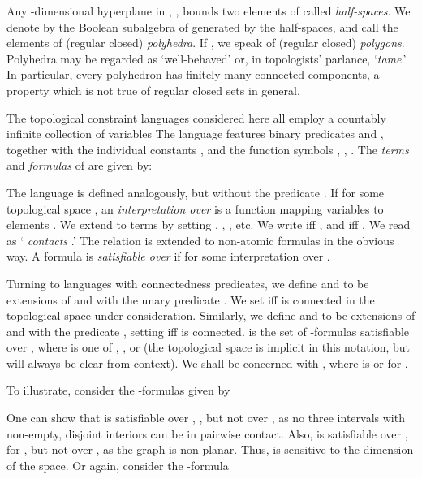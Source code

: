 \documentclass{article}
\begin{document}
Any -dimensional hyperplane in , , bounds two
elements of  called \emph{half-spaces}. We denote by
 the Boolean subalgebra of  generated by the
half-spaces, and call the elements of  (regular closed)
\emph{polyhedra}. If , we speak of (regular closed)
\emph{polygons}. Polyhedra may be regarded as `well-behaved' or, in
topologists' parlance, `\emph{tame}.'  In particular, every polyhedron
has finitely many connected components, a property which is not true
of regular closed sets in general.

The topological constraint languages considered here all employ a
countably infinite collection of variables  The
language  features binary predicates  and , together with
the individual constants ,  and the function symbols ,
, . The \emph{terms}  and \emph{formulas}  of
 are given by:

The language  is defined analogously, but without the predicate
. If  for some topological space , an
\emph{interpretation over}  is a function 
mapping variables  to elements . We extend
 to terms  by setting , , , etc. We write
 iff , and  iff
.  We
read  as ` \emph{contacts} .'  The
relation  is extended to non-atomic formulas in the obvious
way. A formula  is \emph{satisfiable over}  if 
 for some interpretation  over . 

Turning to languages with connectedness predicates, we define 
and  to be extensions of  and  with the unary
predicate . We set  iff
 is connected in the topological space under
consideration. Similarly, we define  and  to be
extensions of  and  with the predicate , setting
 iff  is connected.  is the set of -formulas
satisfiable over , where 
is one of , ,  or  (the
topological space is implicit in this notation, but will always be
clear from context). We shall be concerned with , where
 is  or  for .

To illustrate, consider the -formulas 
given by

One can show that  is satisfiable over , , but not over , as no three intervals with non-empty,
disjoint interiors can be in pairwise contact. Also,  is
satisfiable over , for , but not over
, as the graph  is non-planar.  Thus,  is
sensitive to the dimension of the space.
Or again, consider the -formula 
\end{document}
